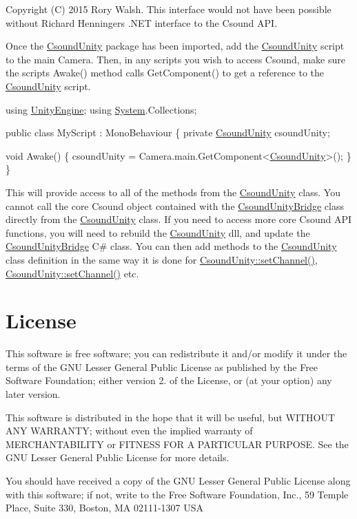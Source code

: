 Copyright (C) 2015 Rory Walsh. This interface would not have been possible without Richard Henninger\textquotesingle{}s .N\+E\+T interface to the Csound A\+P\+I.

Once the \hyperlink{class_csound_unity}{Csound\+Unity} package has been imported, add the \hyperlink{class_csound_unity}{Csound\+Unity} script to the main Camera. Then, in any scripts you wish to access Csound, make sure the script\textquotesingle{}s Awake() method calls Get\+Component() to get a reference to the \hyperlink{class_csound_unity}{Csound\+Unity} script.


\begin{DoxyCode}
\textcolor{keyword}{using} \hyperlink{namespace_unity_engine}{UnityEngine};
\textcolor{keyword}{using} \hyperlink{namespace_system}{System}.Collections;

\textcolor{keyword}{public} \textcolor{keyword}{class }MyScript : MonoBehaviour
\{
    \textcolor{keyword}{private} \hyperlink{class_csound_unity}{CsoundUnity} csoundUnity;
 
    \textcolor{keywordtype}{void} Awake()
    \{
        csoundUnity = Camera.main.GetComponent<\hyperlink{class_csound_unity}{CsoundUnity}>();        
    \}
 \}
\end{DoxyCode}


This will provide access to all of the methods from the \hyperlink{class_csound_unity}{Csound\+Unity} class. You cannot call the core Csound object contained with the \hyperlink{class_csound_unity_bridge}{Csound\+Unity\+Bridge} class directly from the \hyperlink{class_csound_unity}{Csound\+Unity} class. If you need to access more core Csound A\+P\+I functions, you will need to rebuild the \hyperlink{class_csound_unity}{Csound\+Unity} dll, and update the \hyperlink{class_csound_unity_bridge}{Csound\+Unity\+Bridge} C\# class. You can then add methods to the \hyperlink{class_csound_unity}{Csound\+Unity} class definition in the same way it is done for \hyperlink{class_csound_unity_afebc3022044ed76890504f9601e4ff12}{Csound\+Unity\+::set\+Channel()}, \hyperlink{class_csound_unity_afebc3022044ed76890504f9601e4ff12}{Csound\+Unity\+::set\+Channel()} etc.\hypertarget{index_section_licenses}{}\section{License}\label{index_section_licenses}
This software is free software; you can redistribute it and/or modify it under the terms of the G\+N\+U Lesser General Public License as published by the Free Software Foundation; either version 2. of the License, or (at your option) any later version.

This software is distributed in the hope that it will be useful, but W\+I\+T\+H\+O\+U\+T A\+N\+Y W\+A\+R\+R\+A\+N\+T\+Y; without even the implied warranty of M\+E\+R\+C\+H\+A\+N\+T\+A\+B\+I\+L\+I\+T\+Y or F\+I\+T\+N\+E\+S\+S F\+O\+R A P\+A\+R\+T\+I\+C\+U\+L\+A\+R P\+U\+R\+P\+O\+S\+E. See the G\+N\+U Lesser General Public License for more details.

You should have received a copy of the G\+N\+U Lesser General Public License along with this software; if not, write to the Free Software Foundation, Inc., 59 Temple Place, Suite 330, Boston, M\+A 02111-\/1307 U\+S\+A 